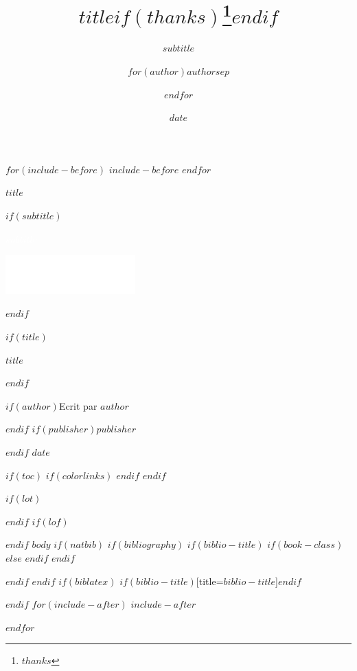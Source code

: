 \documentclass[$if(fontsize)$$fontsize$,$endif$$if(lang)$$babel-lang$,$endif$$if(papersize)$$papersize$paper,$endif$$for(classoption)$$classoption$$sep$,$endfor$]{$documentclass$}
\title{$title$$if(thanks)$\thanks{$thanks$}$endif$}
\subtitle{$subtitle$}
\author{$for(author)$$author$$sep$ \and $endfor$}
\institute{$for(institute)$$institute$$sep$ \and $endfor$}
\date{$date$}
\begin{document}
  $for(include-before)$
  $include-before$
  $endfor$

  \begin{titlepage}

    \begin{omnes}
      \HUGE
      \begin{center}
        {    \textcolor{dcyellow}{\MakeUppercase{\bfseries{$title$}}} }
      \end{center}
      \vspace{0.5cm}
    \end{omnes}
    $if(subtitle)$
    \Large
    \begin{center}
      \textcolor{white}{$subtitle$}
    \end{center}
    \vfill
    \begin{center}
      {\includegraphics[width=5cm]{assets/logo.png}}
    \end{center}
    $endif$
  \end{titlepage}


\vfill

  $if(title)$
  \begin{center} \omnes\LARGE\color{dcblue}
  {$title$}
  \end{center}
  $endif$
  \begin{center}
    {
    $if(author)$Ecrit par \itshape{$author$}\par$endif$
    $if(publisher)$\bfseries{$publisher$}\par$endif$
    $date$
    }
  \end{center}
  \vfill
  \newpage

  $if(toc)$
  {
  $if(colorlinks)$
  \hypersetup{linkcolor=$if(toccolor)$$toccolor$$else$black$endif$}
  $endif$
  \setcounter{tocdepth}{$toc-depth$}
  \tableofcontents
  \newpage
  }
  $endif$

  $if(lot)$
  \listoftables
  $endif$
  $if(lof)$
  \listoffigures
  $endif$
  \pagestyle{fancy}
  $body$
  $if(natbib)$
  $if(bibliography)$
  $if(biblio-title)$
  $if(book-class)$
  \renewcommand\bibname{$biblio-title$}
  $else$
  \renewcommand\refname{$biblio-title$}
  $endif$
  $endif$
  

  $endif$
  $endif$
  $if(biblatex)$
  \printbibliography$if(biblio-title)$[title=$biblio-title$]$endif$

  $endif$
  $for(include-after)$
  $include-after$

  $endfor$
\end{document}
